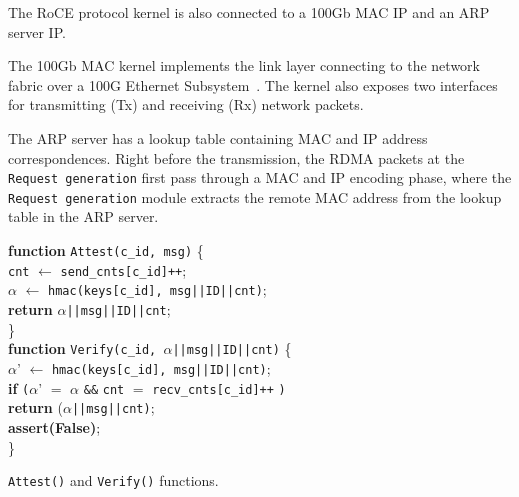  The RoCE protocol kernel is also connected to a 100Gb MAC IP and an ARP server IP. 

 The 100Gb MAC kernel implements the link layer connecting \projecttitle{} to the network fabric over a 100G Ethernet Subsystem~\cite{license}. The kernel also exposes two interfaces for transmitting (Tx) and receiving (Rx) network packets. 

The ARP server has a lookup table containing MAC and IP address correspondences. Right before the transmission, the RDMA packets at the {\tt Request generation} first pass through a MAC and IP encoding phase, where the {\tt Request generation} module extracts the remote MAC address from the lookup table in the ARP server.



\begin{algorithm}[t]
\SetAlgoLined
\footnotesize
\textbf{function} \texttt{Attest(c\_id, msg)} \{ \\
\Indp
{\tt cnt} $\leftarrow$ {\tt send\_cnts[c\_id]++};\\
$\alpha$ $\leftarrow$ {\tt hmac(keys[c\_id], msg||ID||cnt)}; \\
\textbf{return} $\alpha${\tt ||msg||ID||cnt};\\
\Indm
\} \\


\textbf{function} \texttt{Verify(c\_id, $\alpha$||msg||ID||cnt)} \{ \\
\Indp
    $\alpha$' $\leftarrow$ {\tt hmac(keys[c\_id], msg||ID||cnt)};\\
    \textbf{if} {\tt (}$\alpha$' $=$ $\alpha$ {\tt \&\&} {\tt cnt} $=$ {\tt recv\_cnts[c\_id]++} {\tt )} \\
    \Indp
        \textbf{return} ($\alpha${\tt ||msg||cnt)}; \\
    \Indm
    \textbf{assert(False)}; \\
\Indm
\} \\
\vspace{-1pt}
\caption{\texttt{Attest()} and \texttt{Verify()} functions.}
\label{algo:primitives}
\end{algorithm}

